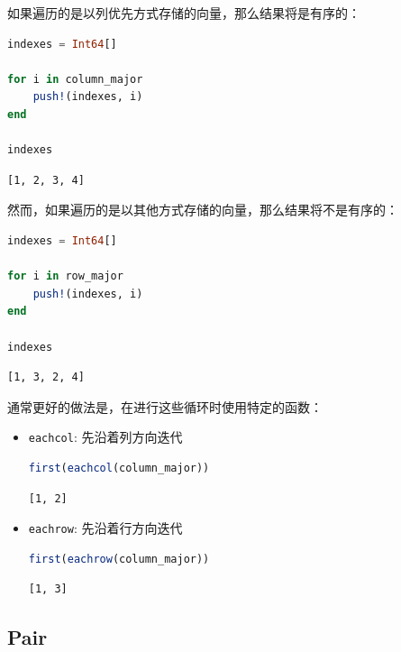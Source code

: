 \documentclass[
  notoc %
]{tufte-book}
\newcommand{\passthrough}[1]{#1}
\begin{document}
如果遍历的是以列优先方式存储的向量，那么结果将是有序的：

\begin{lstlisting}[language=Julia]
indexes = Int64[]

for i in column_major
    push!(indexes, i)
end

indexes
\end{lstlisting}

\begin{lstlisting}[language=Output]
[1, 2, 3, 4]
\end{lstlisting}

然而，如果遍历的是以其他方式存储的向量，那么结果将不是有序的：

\begin{lstlisting}[language=Julia]
indexes = Int64[]

for i in row_major
    push!(indexes, i)
end

indexes
\end{lstlisting}

\begin{lstlisting}[language=Output]
[1, 3, 2, 4]
\end{lstlisting}

通常更好的做法是，在进行这些循环时使用特定的函数：

\begin{itemize}
\item
  \passthrough{\lstinline!eachcol!}: 先沿着列方向迭代

  \begin{lstlisting}[language=Julia]
  first(eachcol(column_major))
  \end{lstlisting}

  \begin{lstlisting}[language=Output]
  [1, 2]
  \end{lstlisting}
\item
  \passthrough{\lstinline!eachrow!}: 先沿着行方向迭代

  \begin{lstlisting}[language=Julia]
  first(eachrow(column_major))
  \end{lstlisting}

  \begin{lstlisting}[language=Output]
  [1, 3]
  \end{lstlisting}
\end{itemize}

\hypertarget{sec:pair}{%
\subsection{Pair}\label{sec:pair}}
\end{document}
